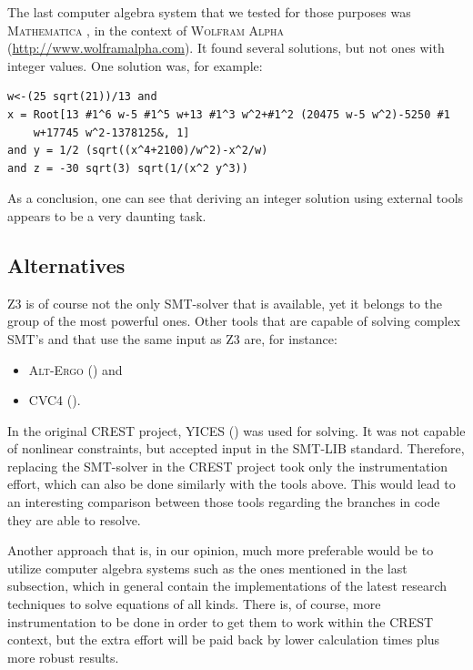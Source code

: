 \documentclass[oribibl]{llncs}
\begin{document}
The last computer algebra system that we tested for those purposes was
\textsc{Mathematica} \cite{wolfram1999mathematica}, in the context of
\textsc{Wolfram Alpha}\\ (\url{http://www.wolframalpha.com}). It found
several solutions, but not ones with integer values. One solution was,
for example:
\begin{verbatim}
w<-(25 sqrt(21))/13 and 
x = Root[13 #1^6 w-5 #1^5 w+13 #1^3 w^2+#1^2 (20475 w-5 w^2)-5250 #1
    w+17745 w^2-1378125&, 1]
and y = 1/2 (sqrt((x^4+2100)/w^2)-x^2/w)
and z = -30 sqrt(3) sqrt(1/(x^2 y^3))
\end{verbatim}

As a conclusion, one can see that deriving an integer solution using
external tools appears to be a very daunting task.

\subsection{Alternatives}

\textsc{Z3} is of course not the only \textsc{SMT}-solver that is
available, yet it belongs to the group of the most powerful
ones. Other tools that are capable of solving complex SMT's and that use the
same input as \textsc{Z3} are, for instance:
\begin{itemize}
  \item \textsc{Alt-Ergo} (\cite{bobotalt}) and
  \item \textsc{CVC4} (\cite{barrett2011cvc4}).
\end{itemize}

In the original \textsc{CREST} project, \textsc{YICES} (\cite{dutertre2006yices}) was used for
solving. It was not capable of nonlinear constraints, but accepted
input in the SMT-LIB standard. Therefore, replacing the SMT-solver in
the \textsc{CREST} project took only the instrumentation effort, which
can also be done similarly with the tools above. This would lead to an
interesting comparison between those tools regarding the branches in
code they are able to resolve.

Another approach that is, in our opinion, much more preferable would be
to utilize computer algebra systems such as the ones mentioned in the last subsection, 
which in general contain the implementations of the latest research techniques to solve equations
of all kinds. There is, of course, more instrumentation to be done in
order to get them to work within the \textsc{CREST} context, but the
extra effort will be paid back by lower calculation times plus more
robust results.
\end{document}
